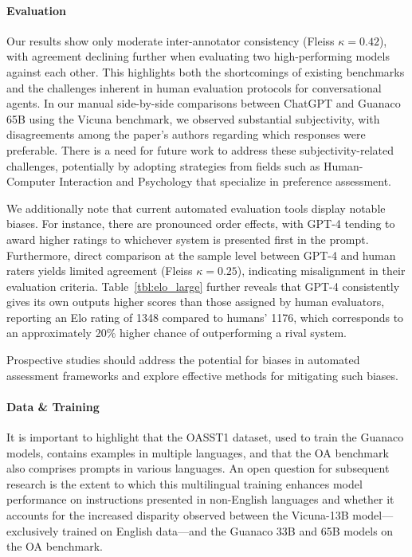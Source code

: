 \paragraph{Evaluation}

Our results show only moderate inter-annotator consistency (Fleiss $\kappa=0.42$), with agreement declining further when evaluating two high-performing models against each other. This highlights both the shortcomings of existing benchmarks and the challenges inherent in human evaluation protocols for conversational agents. In our manual side-by-side comparisons between ChatGPT and {Guanaco} 65B using the Vicuna benchmark, we observed substantial subjectivity, with disagreements among the paper’s authors regarding which responses were preferable. There is a need for future work to address these subjectivity-related challenges, potentially by adopting strategies from fields such as Human-Computer Interaction and Psychology that specialize in preference assessment.

We additionally note that current automated evaluation tools display notable biases. For instance, there are pronounced order effects, with GPT-4 tending to award higher ratings to whichever system is presented first in the prompt. Furthermore, direct comparison at the sample level between GPT-4 and human raters yields limited agreement (Fleiss $\kappa=0.25$), indicating misalignment in their evaluation criteria. Table~\ref{tbl:elo_large} further reveals that GPT-4 consistently gives its own outputs higher scores than those assigned by human evaluators, reporting an Elo rating of 1348 compared to humans' 1176, which corresponds to an approximately 20\% higher chance of outperforming a rival system.

Prospective studies should address the potential for biases in automated assessment frameworks and explore effective methods for mitigating such biases.

\paragraph{Data \& Training} It is important to highlight that the OASST1 dataset, used to train the {Guanaco} models, contains examples in multiple languages, and that the OA benchmark also comprises prompts in various languages. An open question for subsequent research is the extent to which this multilingual training enhances model performance on instructions presented in non-English languages and whether it accounts for the increased disparity observed between the Vicuna-13B model—exclusively trained on English data—and the {Guanaco} 33B and 65B models on the OA benchmark.

